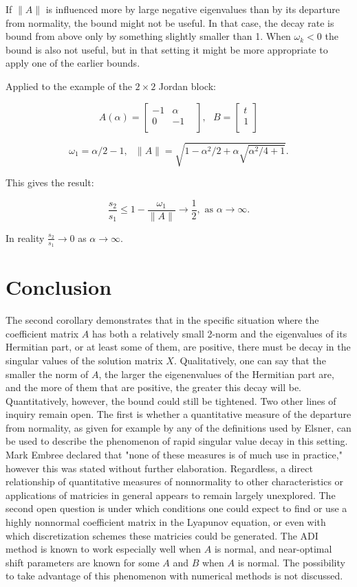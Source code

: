 \documentclass[12pt]{scrartcl}
\begin{document}
If $\|A\|$ is influenced more by large negative eigenvalues than by its departure from normality, the bound might not be useful. In that case, the decay rate is bound from above only by something slightly smaller than 1. When $\omega_{k}<0$ the bound is also not useful, but in that setting it might be more appropriate to apply one of the earlier bounds. 

Applied to the example of the $2 \times 2$ Jordan block:

\[
A(\alpha) =
 \begin{bmatrix}
  -1 & \alpha \\
  0 & -1 &  \\
 \end{bmatrix}, \text{      }
B =
 \begin{bmatrix}
  t \\
  1  \\
 \end{bmatrix}
\] 

$$\omega_{1} = \alpha / 2 - 1, \text{    } \|A\| = \sqrt{1-\alpha^{2}/2+\alpha \sqrt{\alpha^{2}/4+1}}.$$

This gives the result: 

$$\frac{s_{2}}{s_{1}} \leq 1-\frac{\omega_{1}}{\|A\|} \rightarrow \frac{1}{2}, \text{    as }\alpha \rightarrow \infty.$$

In reality $\frac{s_{2}}{s_{1}} \rightarrow 0$ as $\alpha \rightarrow \infty$. 

\section{Conclusion}

The second corollary demonstrates that in the specific situation where the coefficient matrix $A$ has both a relatively small 2-norm and the eigenvalues of its Hermitian part, or at least some of them, are positive, there must be decay in the singular values of the solution matrix $X$. Qualitatively, one can say that the smaller the norm of $A$, the larger the eigenenvalues of the Hermitian part are, and the more of them that are positive, the greater this decay will be. Quantitatively, however, the bound could still be tightened. Two other lines of inquiry remain open. The first is whether a quantitative measure of the departure from normality, as given for example by any of the definitions used by Elsner, can be used to describe the phenomenon of rapid singular value decay in this setting. Mark Embree declared that "none of these measures is of much use in practice," however this was stated without further elaboration. \cite{emb} Regardless, a direct relationship of quantitative measures of nonnormality to other characteristics or applications of matricies in general appears to remain largely unexplored.
The second open question is under which conditions one could expect to find or use a highly nonnormal coefficient matrix in the Lyapunov equation, or even with which discretization schemes these matricies could be generated. The ADI method is known to work especially well when $A$ is normal, and near-optimal shift parameters are known for some $A$ and $B$ when $A$ is normal. The possibility to take advantage of this phenomenon with numerical methods is not discussed.   

\nocite{ips}
\nocite{MR894640}
\nocite{MR3095913}
\nocite{ELS}
\nocite{ANT}
\nocite{TREF}
\nocite{DRU}



\end{document}
